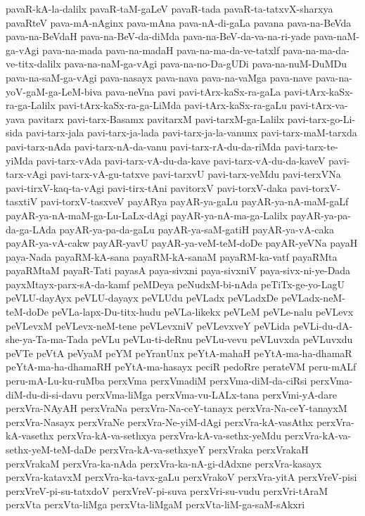 {pavaR-kA-la-dalilx
pavaR-taM-gaLeV
pavaR-tada
pavaR-ta-tatxvX-sharxya
pavaRteV
pava-mA-nAginx
pava-mAna
pava-nA-di-gaLa
pavana
pava-na-BeVda
pava-na-BeVdaH
pava-na-BeV-da-diMda
pava-na-BeV-da-va-na-ri-yade
pava-naM-ga-vAgi
pava-na-mada
pava-na-madaH
pava-na-ma-da-ve-tatxlf
pava-na-ma-da-ve-titx-dalilx
pava-na-naM-ga-vAgi
pava-na-no-Da-gUDi
pava-na-nuM-DuMDu
pava-na-saM-ga-vAgi
pava-nasayx
pava-nava
pava-na-vaMga
pava-nave
pava-na-yoV-gaM-ga-LeM-biva
pava-neVna
pavi
pavi-tArx-kaSx-ra-gaLa
pavi-tArx-kaSx-ra-ga-Lalilx
pavi-tArx-kaSx-ra-ga-LiMda
pavi-tArx-kaSx-ra-gaLu
pavi-tArx-va-yava
pavitarx
pavi-tarx-Basamx
pavitarxM
pavi-tarxM-ga-Lalilx
pavi-tarx-go-Li-sida
pavi-tarx-jala
pavi-tarx-ja-lada
pavi-tarx-ja-la-vanunx
pavi-tarx-maM-tarxda
pavi-tarx-nAda
pavi-tarx-nA-da-vanu
pavi-tarx-rA-du-da-riMda
pavi-tarx-te-yiMda
pavi-tarx-vAda
pavi-tarx-vA-du-da-kave
pavi-tarx-vA-du-da-kaveV
pavi-tarx-vAgi
pavi-tarx-vA-gu-tatxve
pavi-tarxvU
pavi-tarx-veMdu
pavi-terxVNa
pavi-tirxV-kaq-ta-vAgi
pavi-tirx-tAni
pavitorxV
pavi-torxV-daka
pavi-torxV-tasxtiV
pavi-torxV-tasxveV
payARya
payAR-ya-gaLu
payAR-ya-nA-maM-gaLf
payAR-ya-nA-maM-ga-Lu-LaLx-dAgi
payAR-ya-nA-ma-ga-Lalilx
payAR-ya-pa-da-ga-LAda
payAR-ya-pa-da-gaLu
payAR-ya-saM-gatiH
payAR-ya-vA-caka
payAR-ya-vA-cakw
payAR-yavU
payAR-ya-veM-teM-doDe
payAR-yeVNa
payaH
paya-Nada
payaRM-kA-sana
payaRM-kA-sanaM
payaRM-ka-vatf
payaRMta
payaRMtaM
payaR-Tati
payasA
paya-sivxni
paya-sivxniV
paya-sivx-ni-ye-Dada
payxMtayx-parx-sA-da-kamf
peMDeya
peNudxM-bi-nAda
peTiTx-ge-yo-LagU
peVLU-dayAyx
peVLU-dayayx
peVLUdu
peVLadx
peVLadxDe
peVLadx-neM-teM-doDe
peVLa-lapx-Du-titx-hudu
peVLa-likekx
peVLeM
peVLe-nalu
peVLevx
peVLevxM
peVLevx-neM-tene
peVLevxniV
peVLevxveY
peVLida
peVLi-du-dA-she-ya-Ta-ma-Tada
peVLu
peVLu-ti-deRnu
peVLu-vevu
peVLuvxda
peVLuvxdu
peVTe
peVtA
peVyaM
peYM
peYranUnx
peYtA-mahaH
peYtA-ma-ha-dhamaR
peYtA-ma-ha-dhamaRH
peYtA-ma-hasayx
peciR
pedoRre
perateVM
peru-mALf
peru-mA-Lu-ku-ruMba
perxVma
perxVmadiM
perxVma-diM-da-ciRsi
perxVma-diM-du-di-si-davu
perxVma-liMga
perxVma-vu-LALx-tana
perxVmi-yA-dare
perxVra-NAyAH
perxVraNa
perxVra-Na-ceY-tanayx
perxVra-Na-ceY-tanayxM
perxVra-Nasayx
perxVraNe
perxVra-Ne-yiM-dAgi
perxVra-kA-vasAthx
perxVra-kA-vasethx
perxVra-kA-va-sethxya
perxVra-kA-va-sethx-yeMdu
perxVra-kA-va-sethx-yeM-teM-daDe
perxVra-kA-va-sethxyeY
perxVraka
perxVrakaH
perxVrakaM
perxVra-ka-nAda
perxVra-ka-nA-gi-dAdxne
perxVra-kasayx
perxVra-katavxM
perxVra-ka-tavx-gaLu
perxVrakoV
perxVra-yitA
perxVreV-pisi
perxVreV-pi-su-tatxdoV
perxVreV-pi-suva
perxVri-su-vudu
perxVri-tAraM
perxVta
perxVta-liMga
perxVta-liMgaM
perxVta-liM-ga-saM-sAkxri
}
